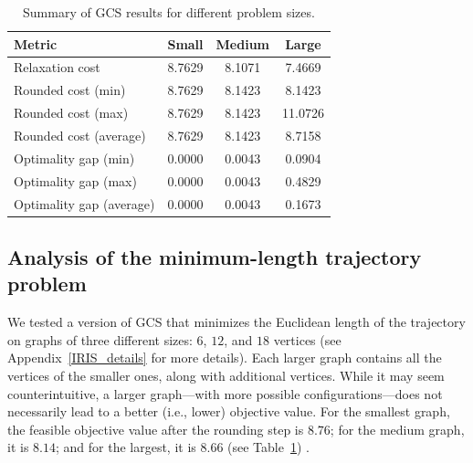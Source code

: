 
\begin{table}[t]
\centering
\caption{Summary of GCS results for different problem sizes.}
\label{table_1}
\begin{tabular}{lccc}
\toprule
\textbf{Metric} & \textbf{Small} & \textbf{Medium} & \textbf{Large} \\
\midrule
Relaxation cost               & 8.7629 & 8.1071 & 7.4669 \\
Rounded cost (min)            & 8.7629 & 8.1423 & 8.1423 \\
Rounded cost (max)            & 8.7629 & 8.1423 & 11.0726 \\
Rounded cost (average)        & 8.7629 & 8.1423 & 8.7158 \\
\midrule
Optimality gap (min)          & 0.0000 & 0.0043 & 0.0904 \\
Optimality gap (max)          & 0.0000 & 0.0043 & 0.4829 \\
Optimality gap (average)      & 0.0000 & 0.0043 & 0.1673 \\
\bottomrule
\end{tabular}
\end{table}

\subsection{Analysis of the minimum-length trajectory problem}
We tested a version of GCS that minimizes the Euclidean length of the trajectory on graphs of three different sizes: $6$, $12$, and $18$ vertices (see Appendix~\ref{IRIS_details} for more details). Each larger graph contains all the vertices of the smaller ones, along with additional vertices. While it may seem counterintuitive, a larger graph—with more possible configurations—does not necessarily lead to a better (i.e., lower) objective value. For the smallest graph, the feasible objective value after the rounding step is $8.76$; for the medium graph, it is $8.14$; and for the largest, it is $8.66$ (see Table~\ref{table_1}) .

